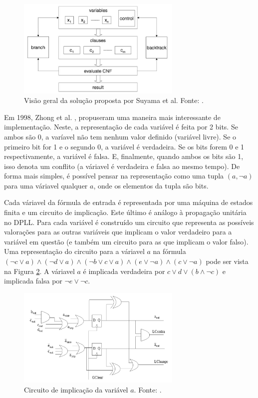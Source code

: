 \documentclass[12pt,a4paper]{article}
\begin{document}
\begin{figure}[H]
    \centering
    \includegraphics[width=0.7\textwidth]{figures/suyama}
    \caption{Visão geral da solução proposta por Suyama et al. Fonte: \cite{skliarova2004reconfigurablehardware}.}
    \label{fig:suyama}
\end{figure}

Em 1998, Zhong et al. \cite{zhong1998usingreconfigurable}, propuseram uma maneira mais interessante de implementação. Neste, a representação de cada variável é feita por 2 bits. Se ambos são 0, a varíavel não tem nenhum valor definido (variável livre). Se o primeiro bit for 1 e o segundo 0, a variável é verdadeira. Se os bits forem 0 e 1 respectivamente, a variável é falsa. E, finalmente, quando ambos os bits são 1, isso denota um conflito (a váriavel é verdadeira e falsa ao mesmo tempo). De forma mais simples, é possível pensar na representação como uma tupla $(a, \lnot a)$ para uma váriavel qualquer $a$, onde os elementos da tupla são bits.

Cada váriavel da fórmula de entrada é representada por uma máquina de estados finita e um circuito de implicação. Este último é análogo à propagação unitária no DPLL. Para cada variável é construído um circuito que representa as possíveis valorações para as outras variáveis que implicam o valor verdadeiro para a variável em questão (e também um circuito para as que implicam o valor falso). Uma representação do circuito para a váriavel $a$ na fórmula $(\lnot c \vee a) \wedge (\lnot d \vee a) \wedge (\lnot b \vee c \vee a) \wedge (e \vee \lnot a) \wedge (c \vee \lnot a)$ pode ser vista na Figura \ref{fig:imp}. A váriavel $a$ é implicada verdadeira por $c \vee d \vee (b \wedge \lnot c)$ e implicada falsa por $\lnot e \vee \lnot c$.

\begin{figure}[H]
    \centering
    \includegraphics[width=0.7\textwidth]{figures/imp}
    \caption{Circuito de implicação da variável $a$. Fonte: \cite{zhong1998usingreconfigurable}.}
    \label{fig:imp}
\end{figure}
\end{document}
